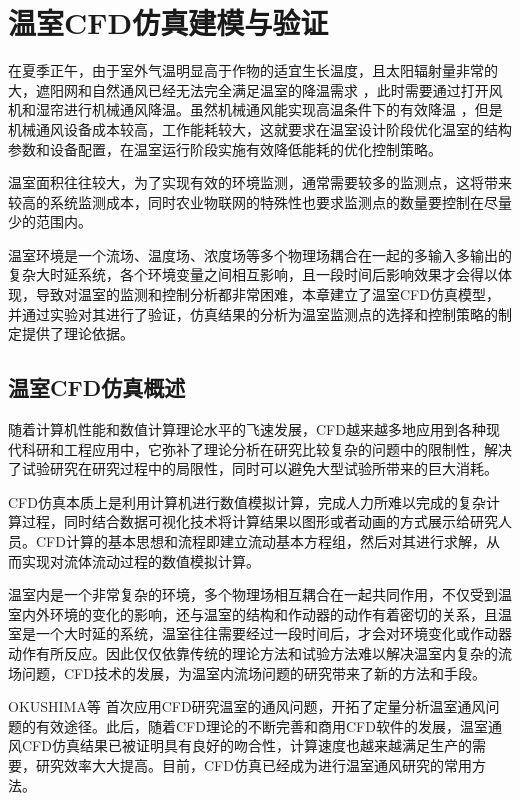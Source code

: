 

\chapter{温室CFD仿真建模与验证}
\label{chapter:CFD}
在夏季正午，由于室外气温明显高于作物的适宜生长温度，且太阳辐射量非常的大，遮阳网和自然通风已经无法完全满足温室的降温需求\supercite{Roy2005} ，此时需要通过打开风机和湿帘进行机械通风降温。虽然机械通风能实现高温条件下的有效降温\supercite{Norton2002,Kumar2009} ，但是机械通风设备成本较高，工作能耗较大，这就要求在温室设计阶段优化温室的结构参数和设备配置，在温室运行阶段实施有效降低能耗的优化控制策略。

温室面积往往较大，为了实现有效的环境监测，通常需要较多的监测点，这将带来较高的系统监测成本，同时农业物联网的特殊性也要求监测点的数量要控制在尽量少的范围内。

温室环境是一个流场、温度场、浓度场等多个物理场耦合在一起的多输入多输出的复杂大时延系统，各个环境变量之间相互影响，且一段时间后影响效果才会得以体现，导致对温室的监测和控制分析都非常困难，本章建立了温室CFD仿真模型，并通过实验对其进行了验证，仿真结果的分析为温室监测点的选择和控制策略的制定提供了理论依据。

\section{温室CFD仿真概述}
随着计算机性能和数值计算理论水平的飞速发展，CFD越来越多地应用到各种现代科研和工程应用中，它弥补了理论分析在研究比较复杂的问题中的限制性，解决了试验研究在研究过程中的局限性，同时可以避免大型试验所带来的巨大消耗。

CFD仿真本质上是利用计算机进行数值模拟计算，完成人力所难以完成的复杂计算过程，同时结合数据可视化技术将计算结果以图形或者动画的方式展示给研究人员。CFD计算的基本思想和流程即建立流动基本方程组，然后对其进行求解，从而实现对流体流动过程的数值模拟计算。

温室内是一个非常复杂的环境，多个物理场相互耦合在一起共同作用，不仅受到温室内外环境的变化的影响，还与温室的结构和作动器的动作有着密切的关系，且温室是一个大时延的系统，温室往往需要经过一段时间后，才会对环境变化或作动器动作有所反应。因此仅仅依靠传统的理论方法和试验方法难以解决温室内复杂的流场问题，CFD技术的发展，为温室内流场问题的研究带来了新的方法和手段。

OKUSHIMA等\supercite{Okushima1989} 首次应用CFD研究温室的通风问题，开拓了定量分析温室通风问题的有效途径。此后，随着CFD理论的不断完善和商用CFD软件的发展，温室通风CFD仿真结果已被证明具有良好的吻合性，计算速度也越来越满足生产的需要，研究效率大大提高。目前，CFD仿真已经成为进行温室通风研究的常用方法\supercite{Sase2004}。

